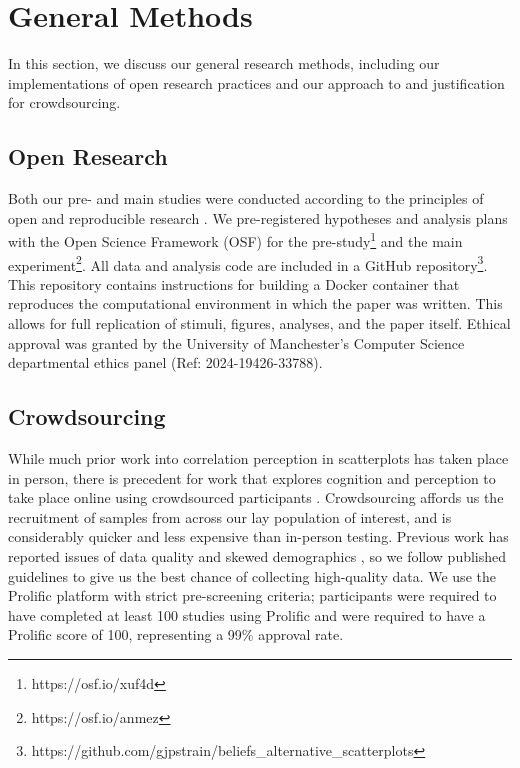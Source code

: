 \documentclass[sigconf]{acmart}
\begin{document}
\section{General Methods}\label{sec-general-methods}

In this section, we discuss our general research methods, including our
implementations of open research practices and our approach to and
justification for crowdsourcing.

\subsection{Open Research}\label{sec-open-research}

Both our pre- and main studies were conducted according to the
principles of open and reproducible research \citep{ayris_2018}. We
pre-registered hypotheses and analysis plans with the Open Science
Framework (OSF) for the pre-study\footnote{https://osf.io/xuf4d} and the
main experiment\footnote{https://osf.io/anmez}. All data and analysis
code are included in a GitHub repository\footnote{https://github.com/gjpstrain/beliefs\_alternative\_scatterplots}.
This repository contains instructions for building a Docker container
\citep{merkel_2014} that reproduces the computational environment in
which the paper was written. This allows for full replication of
stimuli, figures, analyses, and the paper itself. Ethical approval was
granted by the University of Manchester's Computer Science departmental
ethics panel (Ref: 2024-19426-33788).

\subsection{Crowdsourcing}\label{sec-crowdsourcing}

While much prior work into correlation perception in scatterplots has
taken place in person, there is precedent for work that explores
cognition and perception to take place online using crowdsourced
participants \citep{xiong_2022}. Crowdsourcing affords us the
recruitment of samples from across our lay population of interest, and
is considerably quicker and less expensive than in-person testing.
Previous work has reported issues of data quality and skewed
demographics \citep{chmielewski_2020, charalambides_2021, peer_2021}, so
we follow published guidelines \citep{peer_2021} to give us the best
chance of collecting high-quality data. We use the Prolific platform
\citep{prolific} with strict pre-screening criteria; participants were
required to have completed at least 100 studies using Prolific and were
required to have a Prolific score of 100, representing a 99\% approval
rate.
\end{document}
